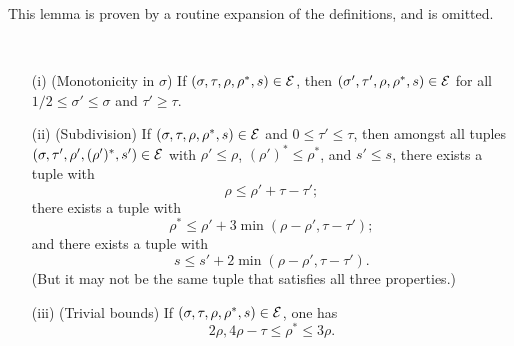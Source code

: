 This lemma is proven by a routine expansion of the definitions, and is omitted.

\begin{lemma}\label{lve-basic}\
    \begin{itemize}
        \item[(i)] (Monotonicity in $\sigma$) If $(\sigma,\tau,\rho,\rho^*,s) \in \mathcal{E}$, then
        $(\sigma',\tau',\rho,\rho^*,s) \in \mathcal{E}$ for all $1/2 \leq \sigma' \leq \sigma$ and $\tau' \geq \tau$.
        \item[(ii)] (Subdivision) If $(\sigma,\tau,\rho,\rho^*,s) \in \mathcal{E}$ and $0 \leq \tau' \leq \tau$, then amongst all tuples $(\sigma,\tau', \rho', (\rho')^*,s') \in \mathcal{E}$ with $\rho' \leq \rho$, $(\rho')^* \leq \rho^*$, and $s' \leq s$, there exists a tuple with
        $$\rho \leq \rho' + \tau - \tau';$$
        there exists a tuple with
        $$\rho^* \leq \rho' + 3\min(\rho-\rho',\tau-\tau');$$
        and there exists a tuple with
        $$s \leq s' + 2\min(\rho-\rho',\tau-\tau').$$
        (But it may not be the same tuple that satisfies all three properties.)
        \item[(iii)]  (Trivial bounds) If $(\sigma,\tau,\rho,\rho^*,s) \in \mathcal{E}$, one has
        $$ 2\rho, 4\rho-\tau \leq \rho^* \leq 3 \rho.$$
    \end{itemize}
\end{lemma}

